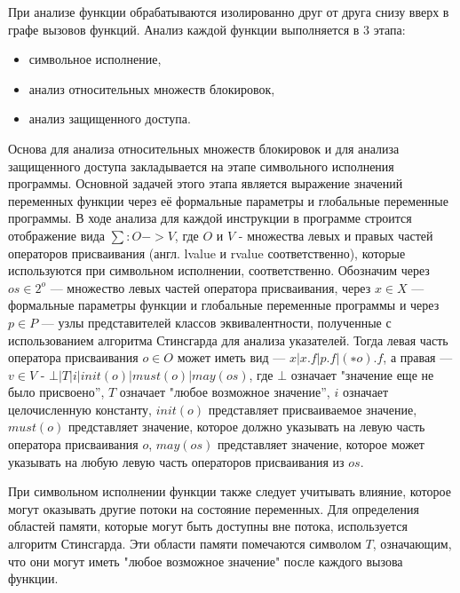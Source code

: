 При анализе функции обрабатываются изолированно друг от друга снизу вверх в графе вызовов функций. Анализ каждой функции выполняется в 3 этапа:

\begin{itemize}
  \item символьное исполнение,
  \item анализ относительных множеств блокировок,
  \item анализ защищенного доступа.
\end{itemize}

Основа для анализа относительных множеств блокировок и для анализа защищенного доступа закладывается на этапе символьного исполнения программы. Основной задачей этого этапа является выражение значений переменных функции через её формальные параметры и глобальные переменные программы. В ходе анализа для каждой инструкции в программе строится отображение вида $\sum: O->V$, где $O$ и $V$ - множества левых и правых частей операторов присваивания (англ. lvalue и rvalue соответственно), которые используются при символьном исполнении, соответственно. Обозначим через $os \in 2^{o}$ —  множество левых частей оператора присваивания, через $x \in X$  — формальные параметры функции и глобальные переменные программы и через $p \in P$ — узлы представителей классов эквивалентности, полученные с использованием алгоритма Стинсгарда для анализа указателей. Тогда левая часть оператора присваивания $o \in O$  может иметь вид — $x | x.f | p.f | (∗o).f$, а правая — $v \in V$ - $⊥ | T | i | init(o) | must(o) | may(os)$, где $⊥$ означает "значение еще не было присвоено”, $T$ означает "любое возможное значение”, $i$ означает целочисленную константу, $init(o)$  представляет присваиваемое значение, $must(o)$ представляет значение, которое должно указывать на левую часть оператора присваивания $o$, $may(os)$ представляет значение, которое может указывать на любую левую часть операторов присваивания из $os$.

При символьном исполнении функции также следует учитывать влияние, которое могут оказывать другие потоки на состояние переменных. Для определения областей памяти, которые могут быть доступны вне потока, используется алгоритм Стинсгарда. Эти области памяти помечаются символом $T$, означающим, что они могут иметь "любое возможное значение" после каждого вызова функции.

